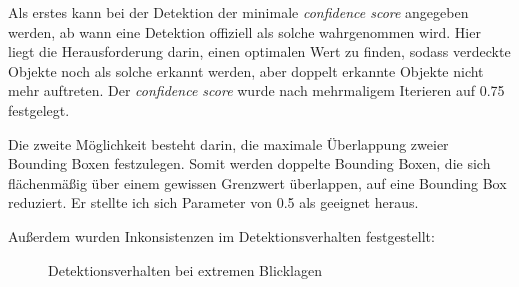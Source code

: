 Als erstes kann bei der Detektion der minimale \textit{confidence score} angegeben werden, ab wann eine Detektion offiziell als solche wahrgenommen wird. Hier liegt die Herausforderung darin, einen optimalen Wert zu finden, sodass verdeckte Objekte noch als solche erkannt werden, aber doppelt erkannte Objekte nicht mehr auftreten. Der \textit{confidence score} wurde nach mehrmaligem Iterieren auf 0.75 festgelegt.

Die zweite Möglichkeit besteht darin, die maximale Überlappung zweier Bounding Boxen festzulegen. Somit werden doppelte Bounding Boxen, die sich flächenmäßig über einem gewissen Grenzwert überlappen, auf eine Bounding Box reduziert. Er stellte ich sich Parameter von 0.5 als geeignet heraus.

Außerdem wurden Inkonsistenzen im Detektionsverhalten festgestellt:

\begin{figure}[ht]
	\centering
	\hspace{2cm}
	\caption{Detektionsverhalten bei extremen Blicklagen}
	\label{lagen}
\end{figure}


